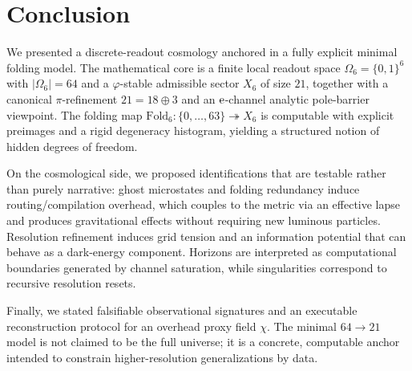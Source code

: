 
\section{Conclusion}
\label{sec:conclusion}

We presented a discrete-readout cosmology anchored in a fully explicit minimal folding model.
The mathematical core is a finite local readout space $\Omega_6=\{0,1\}^6$ with $|\Omega_6|=64$ and a $\varphi$-stable admissible sector $X_6$ of size $21$, together with a canonical $\pi$-refinement $21=18\oplus 3$ and an $\mathrm{e}$-channel analytic pole-barrier viewpoint.
The folding map $\mathrm{Fold}_6:\{0,\dots,63\}\twoheadrightarrow X_6$ is computable with explicit preimages and a rigid degeneracy histogram, yielding a structured notion of hidden degrees of freedom.

On the cosmological side, we proposed identifications that are testable rather than purely narrative:
ghost microstates and folding redundancy induce routing/compilation overhead, which couples to the metric via an effective lapse and produces gravitational effects without requiring new luminous particles.
Resolution refinement induces grid tension and an information potential that can behave as a dark-energy component.
Horizons are interpreted as computational boundaries generated by channel saturation, while singularities correspond to recursive resolution resets.

Finally, we stated falsifiable observational signatures and an executable reconstruction protocol for an overhead proxy field $\chi$.
The minimal $64\to 21$ model is not claimed to be the full universe; it is a concrete, computable anchor intended to constrain higher-resolution generalizations by data.



